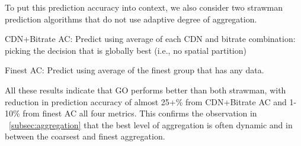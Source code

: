 To put this prediction accuracy into context, we also consider two strawman prediction algorithms that do not use adaptive degree of aggregation.
\begin{packeditemize}
	\item CDN+Bitrate AC: Predict using average of each CDN and bitrate combination: picking the decision that is globally best (i.e., no spatial partition)
	\item Finest AC: Predict using average of the finest group that has any data.
\end{packeditemize}

All these results indicate that GO performs better than both strawman, with reduction in prediction accuracy of almost 25+\% from CDN+Bitrate AC and 1-10\% from finest AC all four metrics. This confirms the observation in \Section~\ref{subsec:aggregation} that the best level of aggregation is often dynamic and in between the coarsest and finest aggregation.

\begin{figure}[t!]
\centering
{}
\hspace{-0.6cm}
\hspace{-0.6cm}
\hspace{-0.6cm}
\label{fig:compare-to-naive}
\end{figure}


